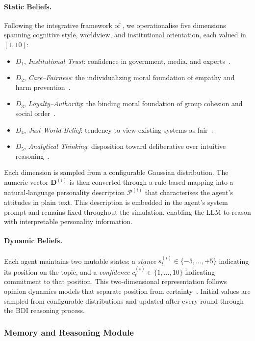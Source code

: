 \paragraph{Static Beliefs.}
Following the integrative framework of \citet{Ecker2022}, we operationalise five dimensions spanning cognitive style, worldview, and institutional orientation, each valued in $[1, 10]$:

\begin{itemize}
\setlength{\itemsep}{1pt}
\item $D_1$, \emph{Institutional Trust}: confidence in government, media, and experts~\citep{Mishler2001}.
\item $D_2$, \emph{Care--Fairness}: the individualizing moral foundation of empathy and harm prevention~\citep{Graham2013}.
\item $D_3$, \emph{Loyalty--Authority}: the binding moral foundation of group cohesion and social order~\citep{Graham2013, Feinberg2019}.
\item $D_4$, \emph{Just-World Belief}: tendency to view existing systems as fair~\citep{Lerner1980}.
\item $D_5$, \emph{Analytical Thinking}: disposition toward deliberative over intuitive reasoning~\citep{Pennycook2021}.
\end{itemize}

Each dimension is sampled from a configurable Gaussian distribution. The numeric vector $\mathbf{D}^{(i)}$ is then converted through a rule-based mapping into a natural-language personality description $\mathcal{P}^{(i)}$ that characterises the agent's attitudes in plain text. This description is embedded in the agent's system prompt and remains fixed throughout the simulation, enabling the LLM to reason with interpretable personality information.

\paragraph{Dynamic Beliefs.}
Each agent maintains two mutable states: a \emph{stance} $s_t^{(i)} \in \{-5, \ldots, +5\}$ indicating its position on the topic, and a \emph{confidence} $c_t^{(i)} \in \{1, \ldots, 10\}$ indicating commitment to that position. This two-dimensional representation follows opinion dynamics models that separate position from certainty~\citep{FriedkinJohnsen1990}. Initial values are sampled from configurable distributions and updated after every round through the BDI reasoning process.


\subsubsection{Memory and Reasoning Module}

